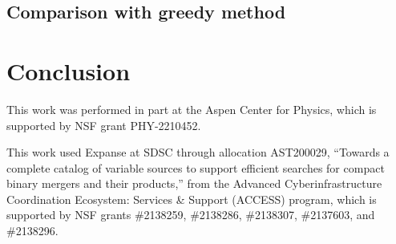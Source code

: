 \documentclass[twocolumn,times]{aastex631}
\begin{document}
\subsection{Comparison with greedy method}

\section{Conclusion}

\begin{acknowledgments}
This work was performed in part at the Aspen Center for Physics, which is supported by \ac{NSF} grant PHY-2210452.

This work used Expanse at \ac{SDSC} through allocation AST200029, ``Towards a complete catalog of variable sources to support efficient searches for compact binary mergers and their products,'' from the Advanced Cyberinfrastructure Coordination Ecosystem: Services \& Support (ACCESS) program, which is supported by \ac{NSF} grants \#2138259, \#2138286, \#2138307, \#2137603, and \#2138296.
\end{acknowledgments}

\vspace{5mm}

{}

\end{document}
